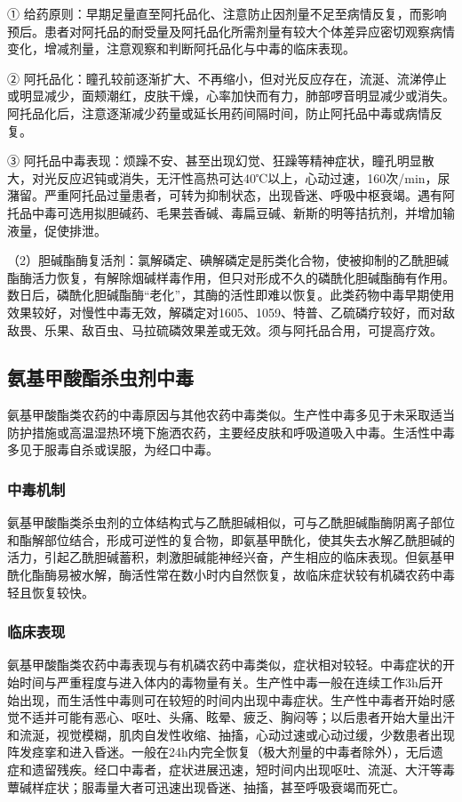 ①
给药原则：早期足量直至阿托品化、注意防止因剂量不足至病情反复，而影响预后。患者对阿托品的耐受量及阿托品化所需剂量有较大个体差异应密切观察病情变化，增减剂量，注意观察和判断阿托品化与中毒的临床表现。

②
阿托品化：瞳孔较前逐渐扩大、不再缩小，但对光反应存在，流涎、流涕停止或明显减少，面颊潮红，皮肤干燥，心率加快而有力，肺部啰音明显减少或消失。阿托品化后，注意逐渐减少药量或延长用药间隔时间，防止阿托品中毒或病情反复。

③
阿托品中毒表现：烦躁不安、甚至出现幻觉、狂躁等精神症状，瞳孔明显散大，对光反应迟钝或消失，无汗性高热可达40℃以上，心动过速，160次/min，尿潴留。严重阿托品过量患者，可转为抑制状态，出现昏迷、呼吸中枢衰竭。遇有阿托品中毒可选用拟胆碱药、毛果芸香碱、毒扁豆碱、新斯的明等拮抗剂，并增加输液量，促使排泄。

（2）胆碱酯酶复活剂：氯解磷定、碘解磷定是肟类化合物，使被抑制的乙酰胆碱酯酶活力恢复，有解除烟碱样毒作用，但只对形成不久的磷酰化胆碱酯酶有作用。数日后，磷酰化胆碱酯酶“老化”，其酶的活性即难以恢复。此类药物中毒早期使用效果较好，对慢性中毒无效，解磷定对1605、1059、特普、乙硫磷疗较好，而对敌敌畏、乐果、敌百虫、马拉硫磷效果差或无效。须与阿托品合用，可提高疗效。

\subsection{氨基甲酸酯杀虫剂中毒}

氨基甲酸酯类农药的中毒原因与其他农药中毒类似。生产性中毒多见于未采取适当防护措施或高温湿热环境下施洒农药，主要经皮肤和呼吸道吸入中毒。生活性中毒多见于服毒自杀或误服，为经口中毒。

\subsubsection{中毒机制}

氨基甲酸酯类杀虫剂的立体结构式与乙酰胆碱相似，可与乙酰胆碱酯酶阴离子部位和酯解部位结合，形成可逆性的复合物，即氨基甲酰化，使其失去水解乙酰胆碱的活力，引起乙酰胆碱蓄积，刺激胆碱能神经兴奋，产生相应的临床表现。但氨基甲酰化酯酶易被水解，酶活性常在数小时内自然恢复，故临床症状较有机磷农药中毒轻且恢复较快。

\subsubsection{临床表现}

氨基甲酸酯类农药中毒表现与有机磷农药中毒类似，症状相对较轻。中毒症状的开始时间与严重程度与进入体内的毒物量有关。生产性中毒一般在连续工作3h后开始出现，而生活性中毒则可在较短的时间内出现中毒症状。生产性中毒者开始时感觉不适并可能有恶心、呕吐、头痛、眩晕、疲乏、胸闷等；以后患者开始大量出汗和流涎，视觉模糊，肌肉自发性收缩、抽搐，心动过速或心动过缓，少数患者出现阵发痉挛和进入昏迷。一般在24h内完全恢复（极大剂量的中毒者除外），无后遗症和遗留残疾。经口中毒者，症状进展迅速，短时间内出现呕吐、流涎、大汗等毒蕈碱样症状；服毒量大者可迅速出现昏迷、抽搐，甚至呼吸衰竭而死亡。

